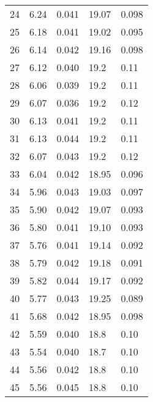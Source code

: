 \begin{table}
\begin{tabular}{c|ll|ll}
24 & 6.24 & 0.041 & 19.07 & 0.098 \\
25 & 6.18 & 0.041 & 19.02 & 0.095 \\
26 & 6.14 & 0.042 & 19.16 & 0.098 \\
27 & 6.12 & 0.040 & 19.2 & 0.11 \\
28 & 6.06 & 0.039 & 19.2 & 0.11 \\
29 & 6.07 & 0.036 & 19.2 & 0.12 \\
30 & 6.13 & 0.041 & 19.2 & 0.11 \\
31 & 6.13 & 0.044 & 19.2 & 0.11 \\
32 & 6.07 & 0.043 & 19.2 & 0.12 \\
33 & 6.04 & 0.042 & 18.95 & 0.096 \\
34 & 5.96 & 0.043 & 19.03 & 0.097 \\
35 & 5.90 & 0.042 & 19.07 & 0.093 \\
36 & 5.80 & 0.041 & 19.10 & 0.093 \\
37 & 5.76 & 0.041 & 19.14 & 0.092 \\
38 & 5.79 & 0.042 & 19.18 & 0.091 \\
39 & 5.82 & 0.044 & 19.17 & 0.092 \\
40 & 5.77 & 0.043 & 19.25 & 0.089 \\
41 & 5.68 & 0.042 & 18.95 & 0.098 \\
42 & 5.59 & 0.040 & 18.8 & 0.10 \\
43 & 5.54 & 0.040 & 18.7 & 0.10 \\
44 & 5.56 & 0.042 & 18.8 & 0.10 \\
45 & 5.56 & 0.045 & 18.8 & 0.10 \\
               \hline
        \end{tabular}
    \end{table}
    \clearpage


